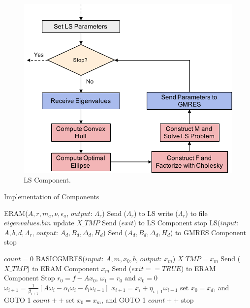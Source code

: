 \begin{figure}[htbp]
	\centering
	\includegraphics[width=4.8in]{fig/LS-component.pdf}
	\caption{LS Component.}
	\label{ls-component}
\end{figure}

\begin{breakablealgorithm}
	\caption{Implementation of Components}   
	\label{alg:gmres/ls-a}   
	\begin{algorithmic}[1]
		\State ERAM($A, r, m_a, \nu,\epsilon_a$, $output$: $\Lambda_r$)
		\State Send ($\Lambda_r$) to LS
		\State write ($\Lambda_r$) to file $eigenvalues.bin$\EndIf
		\State update $X\_TMP$\EndIf
		\State Send ($exit$) to LS Component  \State stop \EndIf
		\EndWhile
		\EndFunction
		\State LS{($input$: $A,b,d,\Lambda_r$, $output$: $A_d, B_d, \Delta_d, H_d$)}
		\State Send ($A_d, B_d, \Delta_d, H_d$) to GMRES Component
		\EndIf
		\State stop \EndIf
		\EndFunction
		
		\State $count=0$
		\State BASICGMRES{($input$: $A, m, x_0,b$, $output$: $x_m$)}
		\State $X\_TMP = x_m$
		\State Send ($X\_TMP$) to ERAM Component
		\State \Return $x_m$
		\State Send ($exit==TRUE$) to ERAM Component
		\State Stop
		\Else {}
		\State $r_0=f-Ax_0$, $\omega_1 = r_0$ and $x_0=0$
		\State $\omega_{i+1}=\frac{1}{\beta_{i+1}}[A\omega_i-\alpha_i\omega_i-\delta_i\omega_{i-1}]$
		\State $x_{i+1}=x_i+\eta_{i+1}\omega_{i+1}$
		\EndFor
		\EndFor
		\State set $x_0=x_d$, and GOTO 1
		\State $count++$
		\EndIf
		\Else
		\State set $x_0=x_m$, and GOTO 1
		\State $count++$
		\EndIf
		\EndIf
		\State stop \EndIf
		\EndFunction
	\end{algorithmic}  
\end{breakablealgorithm}



